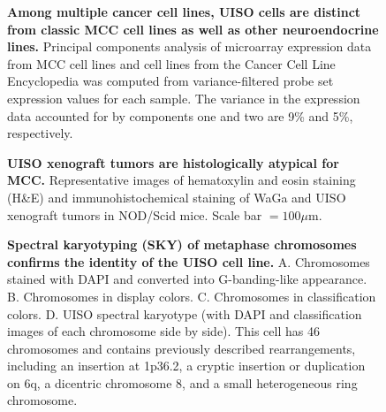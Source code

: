 \documentclass[10pt]{article}
\begin{document}
\begin{figure}[!ht]
  \begin{center}
  \end{center}

  \caption{
    {\bf Among multiple cancer cell lines, UISO cells are distinct from classic MCC cell lines as well as other neuroendocrine lines.}
    Principal components analysis of microarray expression data from MCC cell lines and cell lines from the Cancer Cell Line Encyclopedia was computed from variance-filtered probe set expression values for each sample.
    The variance in the expression data accounted for by components one and two are 9\% and 5\%, respectively.}

  \label{fig:pcaccle}
\end{figure}

\begin{figure}[!ht]
  \begin{center}
  \end{center}

  \caption{
    {\bf UISO xenograft tumors are histologically atypical for MCC.}
    Representative images of hematoxylin and eosin staining (H\&E) and immunohistochemical staining of WaGa and UISO xenograft tumors in NOD/Scid mice.
    Scale bar $=100\mu\mathrm{m}$.}

  \label{fig:ihc}
\end{figure}



\begin{figure}[!ht]
  \begin{center}
  \end{center}
  
  \caption{
    {\bf Spectral karyotyping (SKY) of metaphase chromosomes confirms the identity of the UISO cell line.} 
    A. Chromosomes stained with DAPI and converted into G-banding-like appearance.
    B. Chromosomes in display colors.
    C. Chromosomes in classification colors.
    D. UISO spectral karyotype (with DAPI and classification images of each chromosome side by side).
    This cell has 46 chromosomes and contains previously described rearrangements, including an insertion at 1p36.2, a cryptic insertion or duplication on 6q, a dicentric chromosome 8, and a small heterogeneous ring chromosome.}

  \label{fig:sky}
\end{figure}
\end{document}
